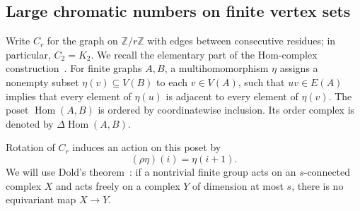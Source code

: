 \documentclass[11pt]{amsart}
\theoremstyle{definition}
\theoremstyle{remark}
\numberwithin{equation}{section}
\newcommand{\Z}{\mathbb Z}
\newcommand{\Hom}{\operatorname{Hom}}
\begin{document}
\subsection{Large chromatic numbers on finite vertex sets}

Write $C_r$ for the graph on $\Z/r\Z$ with edges between consecutive residues; in particular, $C_2=K_2$. We recall the elementary part of the Hom-complex construction~\cite{BabsonKozlov}. For finite graphs $A,B$, a multihomomorphism $\eta$ assigns a nonempty subset $\eta(v)\subseteq V(B)$ to each $v\in V(A)$, such that $uv\in E(A)$ implies that every element of $\eta(u)$ is adjacent to every element of $\eta(v)$. The poset $\Hom(A,B)$ is ordered by coordinatewise inclusion. Its order complex is denoted by $\Delta\Hom(A,B)$.

Rotation of $C_r$ induces an action on this poset by
\[
 (\rho\eta)(i)=\eta(i+1).
\]
We will use Dold's theorem~\cite{Dold}: if a nontrivial finite group acts on an $s$-connected complex $X$ and acts freely on a complex $Y$ of dimension at most $s$, there is no equivariant map $X\to Y$.
\end{document}
